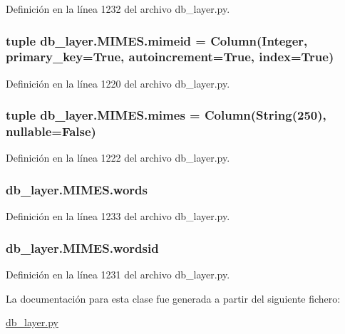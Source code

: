 Definición en la línea 1232 del archivo db\-\_\-layer.\-py.

\hypertarget{classdb__layer_1_1_m_i_m_e_s_a66872c780c00042cd689fd6b0d2028df}{
\subsubsection[{mimeid}]{\setlength{\rightskip}{0pt plus 5cm}tuple db\-\_\-layer.\-M\-I\-M\-E\-S.\-mimeid = Column(Integer, primary\-\_\-key=True, autoincrement=True, index=True)\hspace{0.3cm}{\ttfamily [static]}}}\label{classdb__layer_1_1_m_i_m_e_s_a66872c780c00042cd689fd6b0d2028df}


Definición en la línea 1220 del archivo db\-\_\-layer.\-py.

\hypertarget{classdb__layer_1_1_m_i_m_e_s_a0161e97244015d5d5828ef162f621897}{
\subsubsection[{mimes}]{\setlength{\rightskip}{0pt plus 5cm}tuple db\-\_\-layer.\-M\-I\-M\-E\-S.\-mimes = Column(String(250), nullable=False)\hspace{0.3cm}{\ttfamily [static]}}}\label{classdb__layer_1_1_m_i_m_e_s_a0161e97244015d5d5828ef162f621897}


Definición en la línea 1222 del archivo db\-\_\-layer.\-py.

\hypertarget{classdb__layer_1_1_m_i_m_e_s_a636fc98e28fedf6a5eb57058e2d402d8}{
\subsubsection[{words}]{\setlength{\rightskip}{0pt plus 5cm}db\-\_\-layer.\-M\-I\-M\-E\-S.\-words}}\label{classdb__layer_1_1_m_i_m_e_s_a636fc98e28fedf6a5eb57058e2d402d8}


Definición en la línea 1233 del archivo db\-\_\-layer.\-py.

\hypertarget{classdb__layer_1_1_m_i_m_e_s_a5dd5df331308d3e58b82811885724468}{
\subsubsection[{wordsid}]{\setlength{\rightskip}{0pt plus 5cm}db\-\_\-layer.\-M\-I\-M\-E\-S.\-wordsid}}\label{classdb__layer_1_1_m_i_m_e_s_a5dd5df331308d3e58b82811885724468}


Definición en la línea 1231 del archivo db\-\_\-layer.\-py.



La documentación para esta clase fue generada a partir del siguiente fichero\-:\begin{DoxyCompactItemize}
\item 
\hyperlink{db__layer_8py}{db\-\_\-layer.\-py}\end{DoxyCompactItemize}
